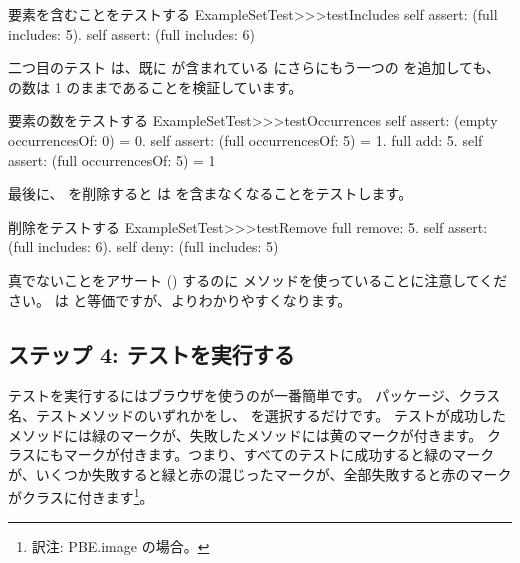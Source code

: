 \documentclass[a4paper,10pt,twoside]{book}
\begin{document}
\begin{method}[testIncludes]{要素を含むことをテストする}
ExampleSetTest>>>testIncludes
	self assert: (full includes: 5).
	self assert: (full includes: 6)
\end{method}

二つ目のテスト  は、既に  が含まれている  にさらにもう一つの  を追加しても、 の数は 1 のままであることを検証しています。

\begin{method}[testOccurrences]{要素の数をテストする}
ExampleSetTest>>>testOccurrences
	self assert: (empty occurrencesOf: 0) = 0.
	self assert: (full occurrencesOf: 5) = 1.
	full add: 5.
	self assert: (full occurrencesOf: 5) = 1
\end{method}

最後に、 を削除すると  は  を含まなくなることをテストします。

\begin{method}[testRemove]{削除をテストする}
ExampleSetTest>>>testRemove
	full remove: 5.
	self assert: (full includes: 6).
	self deny: (full includes: 5)
\end{method}

\noindent
真でないことをアサート () するのに  メソッドを使っていることに注意してください。
 は  と等価ですが、よりわかりやすくなります。
\subsection{ステップ 4: テストを実行する}

テストを実行するにはブラウザを使うのが一番簡単です。
パッケージ、クラス名、テストメソッドのいずれかを{\actclick}し、 を選択するだけです。
テストが成功したメソッドには緑のマークが、失敗したメソッドには黄のマークが付きます。
クラスにもマークが付きます。つまり、すべてのテストに成功すると緑のマークが、いくつか失敗すると緑と赤の混じったマークが、全部失敗すると赤のマークがクラスに付きます\footnote{訳注: PBE.image の場合。}。
\end{document}
